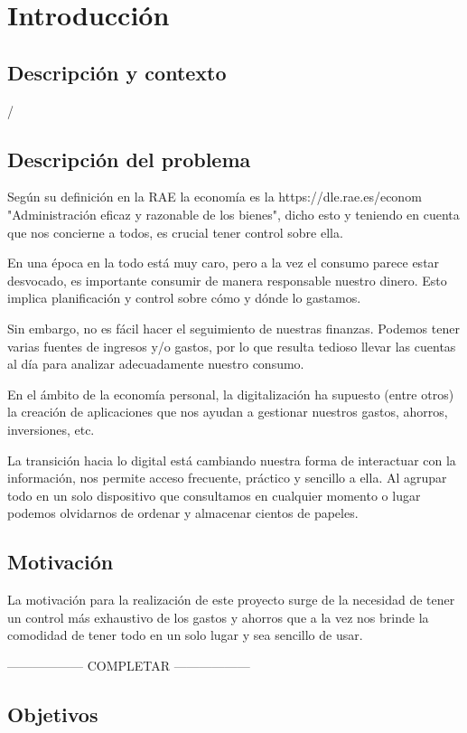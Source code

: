\chapter{Introducción}
\section{Descripción y contexto} / \section{Descripción del problema}

Según su definición en la RAE la economía es la https://dle.rae.es/econom%
"Administración eficaz y razonable de los bienes", dicho esto y teniendo en 
cuenta que nos concierne a todos, es crucial tener control sobre ella. 

En una época en la todo está muy caro, pero a la vez el consumo parece estar 
desvocado, es importante consumir de manera responsable nuestro dinero. Esto 
implica planificación y control sobre cómo y dónde lo gastamos.

Sin embargo, no es fácil hacer el seguimiento de nuestras finanzas. Podemos tener 
varias fuentes de ingresos y/o gastos, por lo que resulta tedioso 
llevar las cuentas al día para analizar adecuadamente nuestro consumo. 

En el ámbito de la economía personal, la digitalización ha supuesto (entre 
otros) la creación de aplicaciones que nos ayudan a gestionar nuestros 
gastos, ahorros, inversiones, etc.

La transición hacia lo digital está cambiando nuestra forma de interactuar con 
la información, nos permite acceso frecuente, práctico y sencillo a ella.
Al agrupar todo en un solo dispositivo que consultamos en cualquier momento o 
lugar podemos olvidarnos de ordenar y almacenar cientos de papeles.

\section{Motivación}
La motivación para la realización de este proyecto surge de la necesidad de 
tener un control más exhaustivo de los gastos y ahorros que a la vez nos brinde 
la comodidad de tener todo en un solo lugar y sea sencillo de usar.

------------------ COMPLETAR ------------------


\section{Objetivos} \label{sect:goals}
